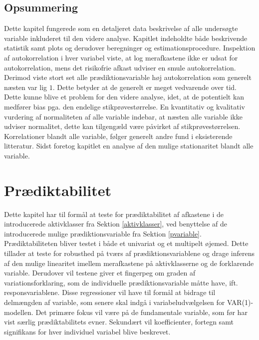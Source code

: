 \documentclass[
  a4paper,
  oneside]{memoir}
\begin{document}
\begin{table}[H]
\begin{threeparttable}
\begin{tablenotes}
\end{tablenotes}
\end{threeparttable}
\end{table}

\hypertarget{ops}{%
\section{Opsummering}\label{ops}}

Dette kapitel fungerede som en detaljeret data beskrivelse af alle undersøgte variable inkluderet til den videre analyse. Kapitlet indeholdte både beskrivende statistik samt plots og derudover beregninger og estimationsprocedure. Inspektion af autokorrelation i hver variabel viste, at log merafkastene ikke er udsat for autokorrelation, mens det risikofrie afkast udviser en smule autokorrelation. Derimod viste stort set alle prædiktionsvariable høj autokorrelation som generelt næsten var lig \(1\). Dette betyder at de generelt er meget vedvarende over tid. Dette kunne blive et problem for den videre analyse, idet, at de potentielt kan medfører bias pga. den endelige stikprøvestørrelse. En kvantitativ og kvalitativ vurdering af normaliteten af alle variable indebar, at næsten alle variable ikke udviser normalitet, dette kan tilgengæld være påvirket af stikprøvestørrelsen. Korrelationer blandt alle variable, følger generelt andre fund i eksisterende litteratur. Sidst foretog kapitlet en analyse af den mulige stationaritet blandt alle variable.

\hypertarget{predikta}{%
\chapter{Prædiktabilitet}\label{predikta}}

Dette kapitel har til formål at teste for prædiktabilitet af afkastene i de introducerede aktivklasser fra Sektion \ref{aktivklasser}, ved benyttelse af de introducerede mulige prædiktionsvariable fra Sektion \ref{pvariable}. Prædiktabiliteten bliver testet i både et univariat og et multipelt øjemed. Dette tillader at teste for robusthed på tværs af prædiktionsvariablene og drage inferens af den mulige linearitet imellem merafkastene på aktivklasserne og de forklarende variable. Derudover vil testene giver et fingerpeg om graden af variationsforklaring, som de individuelle prædiktionsvariable måtte have, ift. responsvariablene. Disse regressioner vil have til formål at bidrage til delmængden af variable, som senere skal indgå i variabeludvælgelsen for VAR(1)-modellen. Det primære fokus vil være på de fundamentale variable, som før har vist særlig prædiktabilitets evner. Sekundært vil koefficienter, fortegn samt signifikans for hver individuel variabel blive beskrevet.
\end{document}
